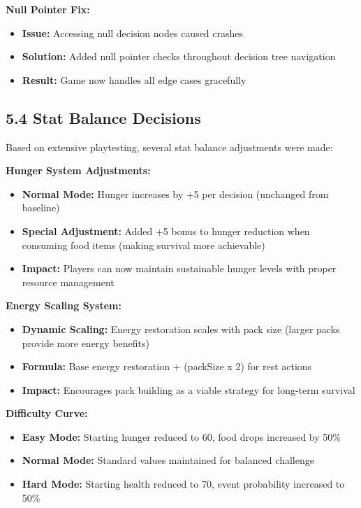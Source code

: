 \documentclass[12pt,a4paper]{article}
\begin{document}
\textbf{Null Pointer Fix:}
\begin{itemize}
	\item \textbf{Issue:} Accessing null decision nodes caused crashes
	\item \textbf{Solution:} Added null pointer checks throughout decision tree navigation
	\item \textbf{Result:} Game now handles all edge cases gracefully
\end{itemize}

\subsection{5.4 Stat Balance Decisions}
Based on extensive playtesting, several stat balance adjustments were made:

\textbf{Hunger System Adjustments:}
\begin{itemize}
	\item \textbf{Normal Mode:} Hunger increases by +5 per decision (unchanged from baseline)
	\item \textbf{Special Adjustment:} Added +5 bonus to hunger reduction when consuming food items (making survival more achievable)
	\item \textbf{Impact:} Players can now maintain sustainable hunger levels with proper resource management
\end{itemize}

\textbf{Energy Scaling System:}
\begin{itemize}
	\item \textbf{Dynamic Scaling:} Energy restoration scales with pack size (larger packs provide more energy benefits)
	\item \textbf{Formula:} Base energy restoration + (packSize x 2) for rest actions
	\item \textbf{Impact:} Encourages pack building as a viable strategy for long-term survival
\end{itemize}

\textbf{Difficulty Curve:}
\begin{itemize}
	\item \textbf{Easy Mode:} Starting hunger reduced to 60, food drops increased by 50\%
	\item \textbf{Normal Mode:} Standard values maintained for balanced challenge
	\item \textbf{Hard Mode:} Starting health reduced to 70, event probability increased to 50\%
\end{itemize}
\end{document}
